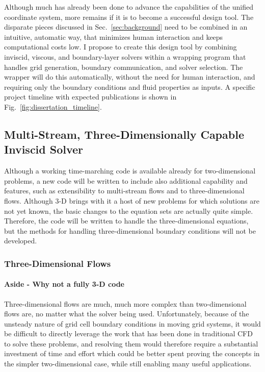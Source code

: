 \documentclass[12pt,letterpaper]{article}
\begin{document}
Although much has already been done to advance the capabilities of the
unified coordinate system, more remains if it is to become a
successful design tool. The disparate pieces discussed in
Sec.~\ref{sec:background} need to be combined in an intuitive,
automatic way, that minimizes human interaction and keeps
computational costs low. I propose to create this design tool by
combining inviscid, viscous, and boundary-layer solvers within a
wrapping program that handles grid generation, boundary
communication, and solver selection. The wrapper will do this
automatically, without the need for human interaction, and requiring
only the boundary conditions and fluid properties as inputs. A
specific project timeline with expected publications is shown in Fig.~\ref{fig:dissertation_timeline}.

\subsection{Multi-Stream, Three-Dimensionally Capable Inviscid Solver}
Although a working time-marching code is available already for
two-dimensional problems, a new code will be written to include also
additional capability and features, such as extensibility to
multi-stream flows and to three-dimensional flows. Although 3-D brings
with it a host of new problems for which solutions are not yet known,
the basic changes to the equation sets are actually quite
simple. Therefore, the code will be written to handle the
three-dimensional equations, but the methods for handling
three-dimensional boundary
conditions will not be developed.
\subsubsection{Three-Dimensional Flows}
\paragraph{Aside - Why not a fully 3-D code}
Three-dimensional flows are much, much more complex than
two-dimensional flows are, no matter what the solver being
used. Unfortunately, because of the unsteady nature of grid cell
boundary conditions in moving grid systems, it would be difficult to
directly leverage the work that has been done in traditional
CFD to solve these problems, and resolving them would therefore
require a substantial investment of time and effort which could be
better spent proving the concepts in the simpler
two-dimensional case, while still enabling many useful applications.
\end{document}
